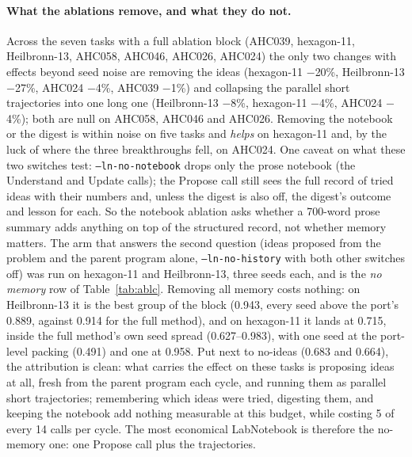 \paragraph{What the ablations remove, and what they do not.} Across the seven tasks with a full
ablation block (AHC039, hexagon-11, Heilbronn-13, AHC058, AHC046, AHC026, AHC024) the only two changes
with effects beyond seed noise are removing the ideas (hexagon-11 $-$20\%, Heilbronn-13 $-$27\%,
AHC024 $-$4\%, AHC039 $-$1\%) and collapsing the parallel short trajectories into one long one
(Heilbronn-13 $-$8\%, hexagon-11 $-$4\%, AHC024 $-$4\%); both are null on AHC058, AHC046 and AHC026.
Removing the notebook or the digest is within noise on five tasks and \emph{helps} on hexagon-11 and,
by the luck of where the three breakthroughs fell, on AHC024. One caveat on what these two switches test: \texttt{--ln-no-notebook}
drops only the prose notebook (the Understand and Update calls); the Propose call still sees the
full record of tried ideas with their numbers and, unless the digest is also off, the digest's
outcome and lesson for each. So the notebook ablation asks whether a 700-word prose summary adds
anything on top of the structured record, not whether memory matters. The arm that answers the
second question (ideas proposed from the problem and the parent program alone,
\texttt{--ln-no-history} with both other switches off) was run on hexagon-11 and Heilbronn-13, three
seeds each, and is the \emph{no memory} row of Table~\ref{tab:ablc}. Removing all memory costs
nothing: on Heilbronn-13 it is the best group of the block (0.943, every seed above the port's
0.889, against 0.914 for the full method), and on hexagon-11 it lands at 0.715, inside the full
method's own seed spread (0.627--0.983), with one seed at the port-level packing (0.491) and one at
0.958. Put next to no-ideas (0.683 and 0.664), the attribution is clean: what carries the effect on
these tasks is proposing ideas at all, fresh from the parent program each cycle, and running them
as parallel short trajectories; remembering which ideas were tried, digesting them, and keeping the
notebook add nothing measurable at this budget, while costing 5 of every 14 calls per cycle. The
most economical LabNotebook is therefore the no-memory one: one Propose call plus the trajectories.


